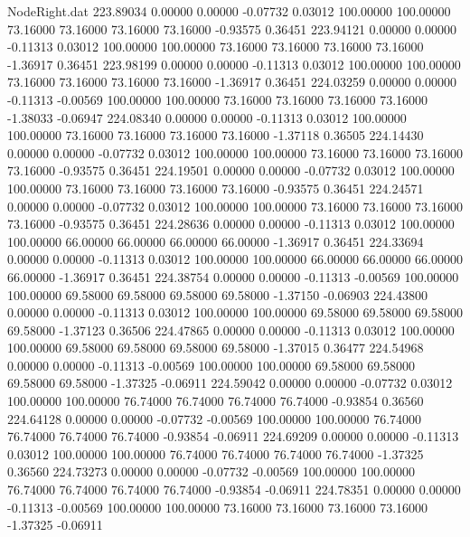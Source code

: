 \begin{filecontents}{NodeRight.dat}
 223.89034    0.00000    0.00000    -0.07732    0.03012  100.00000  100.00000   73.16000   73.16000   73.16000   73.16000   -0.93575    0.36451
 223.94121    0.00000    0.00000    -0.11313    0.03012  100.00000  100.00000   73.16000   73.16000   73.16000   73.16000   -1.36917    0.36451
 223.98199    0.00000    0.00000    -0.11313    0.03012  100.00000  100.00000   73.16000   73.16000   73.16000   73.16000   -1.36917    0.36451
 224.03259    0.00000    0.00000    -0.11313   -0.00569  100.00000  100.00000   73.16000   73.16000   73.16000   73.16000   -1.38033   -0.06947
 224.08340    0.00000    0.00000    -0.11313    0.03012  100.00000  100.00000   73.16000   73.16000   73.16000   73.16000   -1.37118    0.36505
 224.14430    0.00000    0.00000    -0.07732    0.03012  100.00000  100.00000   73.16000   73.16000   73.16000   73.16000   -0.93575    0.36451
 224.19501    0.00000    0.00000    -0.07732    0.03012  100.00000  100.00000   73.16000   73.16000   73.16000   73.16000   -0.93575    0.36451
 224.24571    0.00000    0.00000    -0.07732    0.03012  100.00000  100.00000   73.16000   73.16000   73.16000   73.16000   -0.93575    0.36451
 224.28636    0.00000    0.00000    -0.11313    0.03012  100.00000  100.00000   66.00000   66.00000   66.00000   66.00000   -1.36917    0.36451
 224.33694    0.00000    0.00000    -0.11313    0.03012  100.00000  100.00000   66.00000   66.00000   66.00000   66.00000   -1.36917    0.36451
 224.38754    0.00000    0.00000    -0.11313   -0.00569  100.00000  100.00000   69.58000   69.58000   69.58000   69.58000   -1.37150   -0.06903
 224.43800    0.00000    0.00000    -0.11313    0.03012  100.00000  100.00000   69.58000   69.58000   69.58000   69.58000   -1.37123    0.36506
 224.47865    0.00000    0.00000    -0.11313    0.03012  100.00000  100.00000   69.58000   69.58000   69.58000   69.58000   -1.37015    0.36477
 224.54968    0.00000    0.00000    -0.11313   -0.00569  100.00000  100.00000   69.58000   69.58000   69.58000   69.58000   -1.37325   -0.06911
 224.59042    0.00000    0.00000    -0.07732    0.03012  100.00000  100.00000   76.74000   76.74000   76.74000   76.74000   -0.93854    0.36560
 224.64128    0.00000    0.00000    -0.07732   -0.00569  100.00000  100.00000   76.74000   76.74000   76.74000   76.74000   -0.93854   -0.06911
 224.69209    0.00000    0.00000    -0.11313    0.03012  100.00000  100.00000   76.74000   76.74000   76.74000   76.74000   -1.37325    0.36560
 224.73273    0.00000    0.00000    -0.07732   -0.00569  100.00000  100.00000   76.74000   76.74000   76.74000   76.74000   -0.93854   -0.06911
 224.78351    0.00000    0.00000    -0.11313   -0.00569  100.00000  100.00000   73.16000   73.16000   73.16000   73.16000   -1.37325   -0.06911

\end{filecontents}
